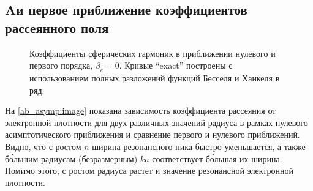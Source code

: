 \subsection*{A и первое приближение коэффициентов рассеянного поля}

\begin{figure}[H]
    \hfil
    \caption{Коэффициенты сферических гармоник в приближении нулевого и первого порядка, $\beta_e = 0$. Кривые ``exact'' построены с использованием полных разложений функций Бесселя и Ханкеля в ряд.}\label{ab_asymp:image}
\end{figure}

На \autoref{ab_asymp:image} показана зависимость коэффициента рассеяния от электронной плотности для двух различных значений радиуса в рамках нулевого асимптотического приближения и сравнение первого и нулевого приближений. Видно, что с ростом $n$ ширина резонансного пика быстро уменьшается, а также б\'{о}льшим радиусам (безразмерным) $ka$ соответствует б\'{о}льшая их ширина. Помимо этого, с ростом радиуса растет и значение резонансной электронной плотности.
